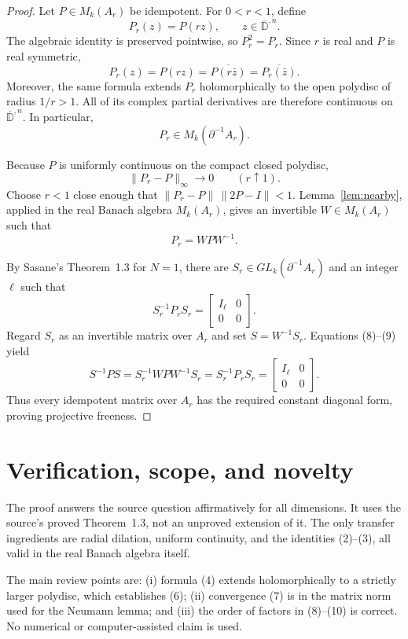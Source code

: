 \documentclass[11pt]{article}
\newcommand{\D}{\mathbb D}
\begin{document}
\begin{proof}
Let \(P\in M_k(A_r)\) be idempotent.  For \(0<r<1\), define
\[
 P_r(z)=P(rz),\qquad z\in\overline{\D}^{,n}.             \tag{4}
\]
The algebraic identity is preserved pointwise, so \(P_r^2=P_r\).  Since
\(r\) is real and \(P\) is real symmetric,
\[
 P_r(z)=P(rz)=\overline{P(r\bar z)}
       =\overline{P_r(\bar z)}.                          \tag{5}
\]
Moreover, the same formula extends \(P_r\) holomorphically to the open
polydisc of radius \(1/r>1\).  All of its complex partial derivatives are
therefore continuous on \(\overline{\D}^{,n}\).  In particular,
\[
 P_r\in M_k(\partial^{-1}A_r).                           \tag{6}
\]

Because \(P\) is uniformly continuous on the compact closed polydisc,
\[
 \|P_r-P\|_\infty\longrightarrow0\qquad(r\uparrow1).     \tag{7}
\]
Choose \(r<1\) close enough that
\(\|P_r-P\|\,\|2P-I\|<1\).  Lemma~\ref{lem:nearby}, applied in the
real Banach algebra \(M_k(A_r)\), gives an invertible \(W\in M_k(A_r)\)
such that
\[
 P_r=WPW^{-1}.                                           \tag{8}
\]

By Sasane's Theorem~1.3 for \(N=1\), there are
\(S_r\in GL_k(\partial^{-1}A_r)\) and an integer \(\ell\) such that
\[
 S_r^{-1}P_rS_r=\begin{bmatrix}I_\ell&0\\0&0\end{bmatrix}. \tag{9}
\]
Regard \(S_r\) as an invertible matrix over \(A_r\) and set
\(S=W^{-1}S_r\).  Equations (8)--(9) yield
\[
 S^{-1}PS
 =S_r^{-1}WPW^{-1}S_r
 =S_r^{-1}P_rS_r
 =\begin{bmatrix}I_\ell&0\\0&0\end{bmatrix}.           \tag{10}
\]
Thus every idempotent matrix over \(A_r\) has the required constant
diagonal form, proving projective freeness.
\end{proof}

\section{Verification, scope, and novelty}

The proof answers the source question affirmatively for all dimensions.  It
uses the source's proved Theorem~1.3, not an unproved extension of it.  The
only transfer ingredients are radial dilation, uniform continuity, and the
identities (2)--(3), all valid in the real Banach algebra itself.

The main review points are: (i) formula (4) extends holomorphically to a
strictly larger polydisc, which establishes (6); (ii) convergence (7) is in
the matrix norm used for the Neumann lemma; and (iii) the order of factors in
(8)--(10) is correct.  No numerical or computer-assisted claim is used.
\end{document}
